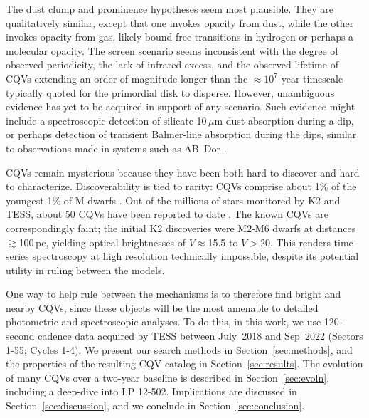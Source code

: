 \documentclass[11pt,twocolumn,tighten]{aastex63}
\begin{document}
The dust clump and prominence hypotheses seem most plausible.  They
are qualitatively similar, except that one invokes opacity from dust,
while the other invokes opacity from gas, likely bound-free
transitions in hydrogen or perhaps a molecular opacity.  The screen
scenario seems inconsistent with the degree of observed periodicity,
the lack of infrared excess, and the observed lifetime of CQVs
extending an order of magnitude longer than the $\approx$$10^7$ year
timescale typically quoted for the primordial disk to disperse.
However, unambiguous evidence has yet to be acquired in support of any
scenario.  Such evidence might include a spectroscopic detection of
silicate 10\,$\mu$m dust absorption during a dip, or perhaps detection
of transient Balmer-line absorption during the dips, similar to
observations made in systems such as AB~Dor \citep[see the review
by][]{1999ASPC..158..146C}.

CQVs remain mysterious because they have been both hard to discover
and hard to characterize.   Discoverability is tied to rarity: CQVs
comprise about 1\% of the youngest 1\% of M-dwarfs
\citep{2018AJ....155..196R}.  Out of the millions of stars monitored
by K2 and TESS, about 50 CQVs have been reported to date
\citep{2016AJ....152..114R,2017AJ....153..152S,2018AJ....155...63S,2019ApJ...876..127Z,2020AJ....160...86B,2022AJ....163..144G,2023ApJ...945..114P}.
The known CQVs are correspondingly faint; the initial K2 discoveries
\citep{2016AJ....152..114R,2017AJ....153..152S} were M2-M6 dwarfs at
distances $\gtrsim$100\,pc, yielding optical brightnesses of
$V$$\approx$15.5 to $V$$>$20.  This renders time-series spectroscopy
at high resolution technically impossible, despite its potential
utility in ruling between the models.

One way to help rule between the mechanisms is to therefore find
bright and nearby CQVs, since these objects will be the most amenable
to detailed photometric and spectroscopic analyses.  To do this, in
this work, we use 120-second cadence data acquired by TESS between
July~2018 and Sep~2022 (Sectors 1-55; Cycles 1-4).  We present our
search methods in Section~\ref{sec:methods}, and the properties of the
resulting CQV catalog in Section~\ref{sec:results}.  The evolution of
many CQVs over a two-year baseline is described in
Section~\ref{sec:evoln}, including a deep-dive into LP 12-502.
Implications are discussed in Section~\ref{sec:discussion}, and we
conclude in Section~\ref{sec:conclusion}.
\end{document}
